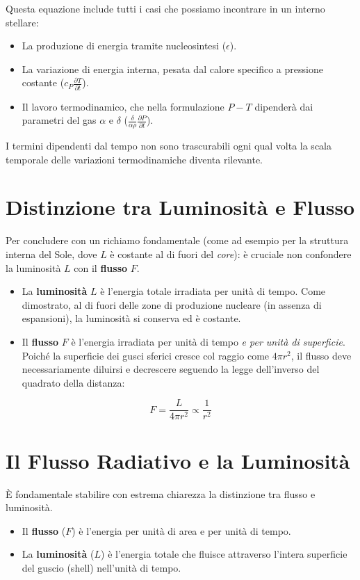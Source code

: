 Questa equazione include tutti i casi che possiamo incontrare in un interno stellare:
\begin{itemize}
\item La produzione di energia tramite nucleosintesi ($\epsilon$).
\item La variazione di energia interna, pesata dal calore specifico a pressione costante ($c_P \frac{\partial T}{\partial t}$).
\item Il lavoro termodinamico, che nella formulazione $P-T$ dipenderà dai parametri del gas $\alpha$ e $\delta$ ($\frac{\delta}{\alpha \rho} \frac{\partial P}{\partial t}$).
\end{itemize}

I termini dipendenti dal tempo non sono trascurabili ogni qual volta la scala temporale delle variazioni termodinamiche diventa rilevante.

\section{Distinzione tra Luminosità e Flusso}

Per concludere con un richiamo fondamentale (come ad esempio per la struttura interna del Sole, dove $L$ è costante al di fuori del \textit{core}): è cruciale non confondere la luminosità $L$ con il \textbf{flusso} $F$.
\begin{itemize}
\item La \textbf{luminosità} $L$ è l'energia totale irradiata per unità di tempo. Come dimostrato, al di fuori delle zone di produzione nucleare (in assenza di espansioni), la luminosità si conserva ed è costante.
\item Il \textbf{flusso} $F$ è l'energia irradiata per unità di tempo \textit{e per unità di superficie}. Poiché la superficie dei gusci sferici cresce col raggio come $4 \pi r^2$, il flusso deve necessariamente diluirsi e decrescere seguendo la legge dell'inverso del quadrato della distanza:
\end{itemize}
\begin{equation}
F = \frac{L}{4 \pi r^2} \propto \frac{1}{r^2}
\end{equation}

\section{Il Flusso Radiativo e la Luminosità}

È fondamentale stabilire con estrema chiarezza la distinzione tra flusso e luminosità.
\begin{itemize}
\item Il \textbf{flusso} ($F$) è l'energia per unità di area e per unità di tempo.
\item La \textbf{luminosità} ($L$) è l'energia totale che fluisce attraverso l'intera superficie del guscio (shell) nell'unità di tempo.
\end{itemize}

